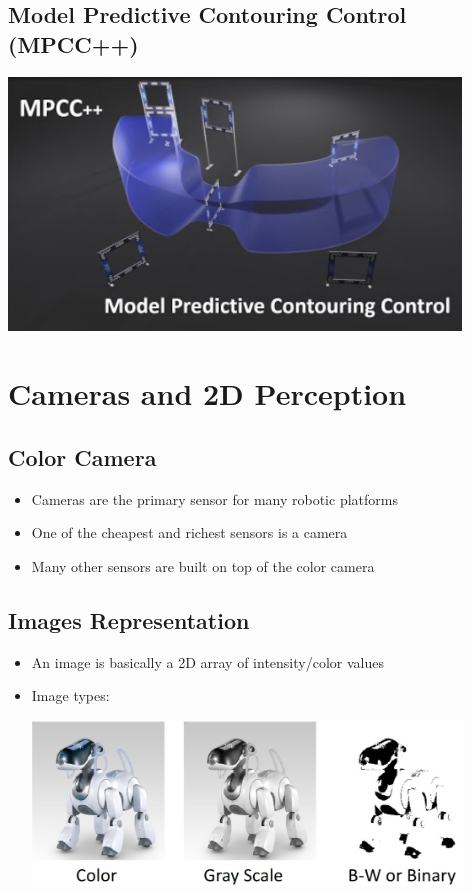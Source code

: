 \documentclass[10pt]{article}
\begin{document}
\subsection*{Model Predictive Contouring Control (MPCC++)}
\begin{center} 
	\includegraphics*[width=0.9\textwidth]{L1_3.png} 
\end{center}

\section*{Cameras and 2D Perception}
\subsection*{Color Camera}
\begin{itemize}
	\item Cameras are the primary sensor for many robotic platforms
	\item One of the cheapest and richest sensors is a camera
	\item Many other sensors are built on top of the color camera
\end{itemize}

\subsection*{Images Representation}
\begin{itemize}
	\item An image is basically a 2D array of intensity/color values
	\item Image types:
	\begin{center} 
        \includegraphics*[width=0.9\textwidth]{L1_4.png} 
    \end{center}
\end{itemize}
\end{document}
